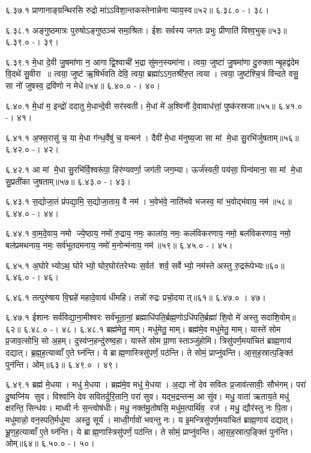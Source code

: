 ६.३७.१
प्राणानाङ्ग्रन्थिरसि रुद्रो मा॑ऽऽविशा॒न्तकस्तेनान्नेनाप्याय॒स्व॥५२॥
६.३८.०
-। ३८।
\anuvakamend

६.३८.१
अङ्गुष्ठमात्रः पुरुषोऽङ्गुष्ठञ्च॑ समा॒श्रितः। ईशः सर्वस्य जगतः प्रभुः प्रीणाति॑ विश्व॒भुक्॥५३॥
६.३९.०
-। ३९।
\anuvakamend

६.३९.१
मे॒धा दे॒वी जु॒षमा॑णा न॒ आगाद्वि॒श्वाची॑ भ॒द्रा सु॑मन॒स्यमा॑ना। त्वया॒ जुष्टा॑ जु॒षमा॑णा दु॒रुक्तान्बृ॒हद्व॑देम वि॒दथे॑ सु॒वीरा॥ त्वया॒ जुष्ट॑ ऋ॒षिर्भ॑वति देवि॒ त्वया॒ ब्रह्मा॑ऽऽग॒तश्री॑रु॒त त्वया। त्वया॒ जुष्ट॑श्चि॒त्रं  वि॑न्दते वसु॒ सा नो॑ जुषस्व॒ द्रवि॑णो न मेधे॥५४॥
६.४०.०
-। ४०।
\anuvakamend

६.४०.१
मे॒धां म॒ इन्द्रो॑ ददातु मे॒धान्दे॒वी सर॑स्वती। मे॒धां मे॑ अ॒श्विनौ॑ दे॒वावाध॑त्तां॒ पुष्क॑रस्रजा॥५५॥
६.४१.०
-। ४१।
\anuvakamend

६.४१.१
अ॒फ्स॒रासु॑ च॒ या मे॒धा ग॑न्ध॒र्वेषु॑ च॒ यन्मन॑। दैवी॑ मे॒धा म॑नुष्य॒जा सा मां मे॒धा सु॒रभि॑र्जुषताम्॥५६॥
६.४२.०
-। ४२।
\anuvakamend

६.४२.१
आ मां मे॒धा सु॒रभि॑र्वि॒श्वरू॑पा॒ हिर॑ण्यवर्णा॒ जग॑ती जग॒म्या। ऊर्ज॑स्वती॒ पय॑सा॒ पिन्व॑माना॒ सा मां मे॒धा सु॒प्रती॑का जुषताम्॥५७॥
६.४३.०
-। ४३।
\anuvakamend

६.४३.१
स॒द्योजा॒तं प्र॑पद्या॒मि॒ स॒द्योजा॒ताय॒ वै नम॑। भ॒वेभ॑वे॒ नाति॑भवे भजस्व॒ मां भ॒वोद्भ॑वाय॒ नम॑॥५८॥
६.४४.०
-। ४४।
\anuvakamend

६.४४.१
वा॒म॒दे॒वाय॒ नमो ज्ये॒ष्ठाय॒ नमो॑ रु॒द्राय॒ नमः॒ काला॑य॒ नमः॒ कल॑विकरणाय॒ नमो॒ बल॑विकरणाय॒ नमो॒ बल॑प्रमथनाय॒ नमः॒ सर्व॑भूतदमनाय॒ नमो॑ म॒नोन्म॑नाय॒ नम॑॥५९॥
६.४५.०
-। ४५।
\anuvakamend

६.४५.१
अ॒घोरेभ्योऽथ॒ घोरेभ्यो॒ घोर॒घोर॑तरेभ्यः स॒र्वत॑ शर्व॒ सर्वेभ्यो॒ नम॑स्ते अस्तु रु॒द्ररू॑पेभ्यः॥६०॥
६.४६.०
-। ४६।
\anuvakamend

६.४६.१
तत्पुरु॑षाय वि॒द्महे॑ महादे॒वाय॑ धीमहि। तन्नो॑ रुद्रः प्रचो॒दयात्॥६१॥
६.४७.०
। ४७।
\anuvakamend

६.४७.१
ईशानः सर्व॑विद्या॒ना॒मीश्वरः सर्व॑भूता॒नां॒ ब्रह्माधि॑पति॒र्ब्रह्म॒णोऽधि॑पति॒र्ब्रह्मा॑ शि॒वो मे॑ अस्तु सदाशि॒वोम्॥६२॥
६.४८.०
-। ४८।
६.४८.१
ब्रह्म॑मेतु॒ माम्। मधु॑मेतु॒ माम्। ब्रह्म॑मे॒व मधु॑मेतु॒ माम्। यास्ते॑ सोम प्र॒जाव॒त्सोभि॒ सो अ॒हम्। दुस्व॑प्न॒हन्दु॑रुष्व॒हा। यास्ते॑ सोम प्रा॒णास्ताञ्जु॑होमि। त्रिसु॑पर्ण॒मया॑चितं ब्राह्म॒णाय॑ दद्यात्। ब्र॒ह्म॒ह॒त्याव्वाँ ए॒ते घ्न॑न्ति। ये ब्राह्म॒णास्त्रिसु॑पर्णं॒ पठ॑न्ति। ते सोमं॒ प्राप्नु॑वन्ति। आ॒स॒ह॒स्रात्प॒ङ्क्तिं पुन॑न्ति। ओम्॥६३॥
६.४९.०
। ४९।
\anuvakamend

६.४९.१
ब्रह्म॑ मे॒धया। मधु॑ मे॒धया। ब्रह्म॑मे॒व मधु॑ मे॒धया। अ॒द्या नो॑ देव सवितः प्र॒जाव॑त्सावीः॒ सौभ॑गम्। परा॑ दु॒ष्वप्नि॑य सुव। विश्वा॑नि देव सवितर्दुरि॒तानि॒ परा॑ सुव। यद्भ॒द्रन्तन्म॒ आ सु॑व। मधु॒ वाता॑ ऋताय॒ते मधु॑ क्षरन्ति॒ सिन्ध॑वः। माध्वीर्नः स॒न्त्वोष॑धीः। मधु॒ नक्त॑मु॒तोषसि॒ मधु॑म॒त्पार्थि॑व॒ रज॑। मधु॒ द्यौर॑स्तु नः पि॒ता। मधु॑मान्नो॒ वन॒स्पति॒र्मधु॑मा अस्तु॒ सूर्य॑। माध्वी॒र्गावो॑ भवन्तु नः। य इ॒मन्त्रिसु॑पर्ण॒मया॑चितं ब्राह्म॒णाय॑ दद्यात्। भ्रू॒ण॒ह॒त्याव्वाँ ए॒ते घ्न॑न्ति। ये ब्राह्म॒णास्त्रिसु॑पर्णं॒ पठ॑न्ति। ते सोमं॒ प्राप्नु॑वन्ति। आ॒स॒ह॒स्रात्प॒ङ्क्तिं पुन॑न्ति। ओम्॥६४॥
६.५०.०
-। ५०।
\anuvakamend

